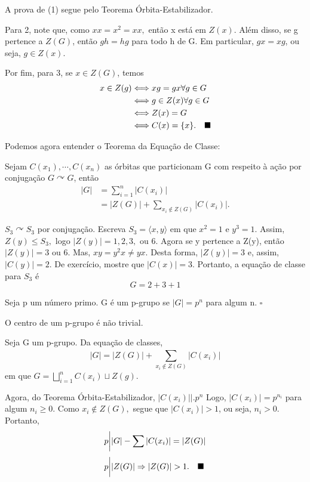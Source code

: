 \documentclass[Algebra/algebra_notes.tex]{subfiles}
\begin{document}
\begin{proof*}
	A prova de (1) segue pelo Teorema Órbita-Estabilizador.

	Para 2, note que, como \(xx = x^{2} = xx,\) então x está em \(Z(x).\) Além disso,
	se g pertence a \(Z(G)\), então \(gh = hg\) para todo h de G. Em particular, \(gx = xg\),
	ou seja, \(g\in Z(x)\).

	Por fim, para 3, se \(x\in Z(G)\), temos
	\begin{align*}
		x\in Z(g) & \Longleftrightarrow xg=gx \forall g\in G                \\
		          & \Longleftrightarrow g\in Z(x) \forall g\in G            \\
		          & \Longleftrightarrow Z(x) = G                            \\
		          & \Longleftrightarrow C(x) = \{x\}.\quad\text{$\blacksquare$}
	\end{align*}
\end{proof*}
Podemos agora entender o Teorema da Equação de Classe:
\hypertarget{class_eqn}{
	\begin{theorem*}
		Sejam \(C(x_{1}), \cdots, C(x_{n})\) as órbitas que particionam G com respeito
		à ação por conjugação \(G \curvearrowright G\), então
		\begin{align*}
			|G| & = \sum\limits_{i=1}^{n}|C(x_{i})|                        \\
			    & = |Z(G)| + \sum\limits_{x_{i}\not\in Z(G)}^{}|C(x_{i})|.
		\end{align*}
	\end{theorem*}}
\begin{example*}
	\(S_{3} \curvearrowright S_{3}\) por conjugação. Escreva \(S_{3} = \langle x, y \rangle\)
	em que \(x^{2} = 1\) e \(y^{3}=1.\) Assim, \(Z(y)\leq S_{3},\) logo \(|Z(y)| = 1, 2, 3,\) ou 6.
	Agora se y pertence a Z(y), então \(|Z(y)| = 3\) ou 6. Mas, \(xy=y^{2}x\neq yx.\) Desta forma,
	\(|Z(y)|=3\) e, assim, \(|C(y)|=2.\) De exercício, mostre que \(|C(x)| = 3.\)
	Portanto, a equação de classe para \(S_{3}\) é
	\[
		G = 2 + 3 + 1
	\]
\end{example*}
\begin{def*}
	Seja p um número primo. G é um p-grupo se \(|G| = p^{n}\) para algum n. \(\square\)
\end{def*}
\begin{prop*}
	O centro de um p-grupo é não trivial.
\end{prop*}
\begin{proof*}
	Seja G um p-grupo. Da equação de classes,
	\[
		|G| = |Z(G)| + \sum\limits_{x_{i}\not\in Z(G)}^{}|C(x_{i})|
	\]
	em que \(G = \bigsqcup_{i=1}^{n}{C(x_{i})}\sqcup Z(g).\)

	Agora, do Teorema Órbita-Estabilizador, \(|C(x_{i})|\biggl|\biggr. p^{n}\) Logo,
	\(|C(x_{i})| = p^{n_{i}}\) para algum \(n_{i}\geq 0\). Como \(x_{i}\not\in Z(G),\) segue
	que \(|C(x_{i})| > 1\), ou seja, \(n_{i} > 0.\) Portanto,
	\begin{align*}
		 & p\biggl|\biggr. |G| - \sum\limits_{}^{}|C(x_{i})| = |Z(G)|           \\
		 & p\biggl|\biggr. |Z(G)| \Rightarrow |Z(G)| > 1.\quad\text{$\blacksquare$}
	\end{align*}
\end{proof*}
\end{document}
